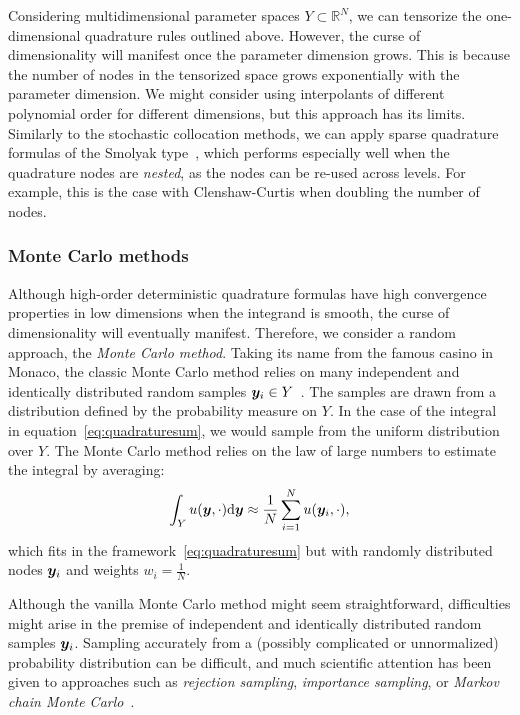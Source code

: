 Considering multidimensional parameter spaces $Y\subset \mathbb{R}^N$, we can tensorize the one-dimensional quadrature rules outlined above.
However, the curse of dimensionality will manifest once the parameter dimension grows.
This is because the number of nodes in the tensorized space grows exponentially with the parameter dimension.
We might consider using interpolants of different polynomial order for different dimensions, but this approach has its limits.
Similarly to the stochastic collocation methods, we can apply sparse quadrature formulas of the Smolyak type~\cite{bungartz2004}, which performs especially well when the quadrature nodes are \emph{nested}, as the nodes can be re-used across levels.
For example, this is the case with Clenshaw-Curtis when doubling the number of nodes.

\subsubsection{Monte Carlo methods}
Although high-order deterministic quadrature formulas have high convergence properties in low dimensions when the integrand is smooth, the curse of dimensionality will eventually manifest.
Therefore, we consider a random approach, the \emph{Monte Carlo method}.
Taking its name from the famous casino in Monaco, the classic Monte Carlo method relies on many independent and identically distributed random samples ${\bm{y}_i}\in Y$~\cite{teckentrup2013}.
The samples are drawn from a distribution defined by the probability measure on $Y$.
In the case of the integral in equation~\eqref{eq:quadraturesum}, we would sample from the uniform distribution over $Y$.
The Monte Carlo method relies on the law of large numbers to estimate the integral by averaging:
\begin{equation*}
    \int_Y u({\bm{y}},\cdot) \mathrm{d}{\bm{y}} \approx \frac{1}{N} \sum_{i=1}^N u({\bm{y}}_i,\cdot),
\end{equation*}
which fits in the framework~\eqref{eq:quadraturesum} but with randomly distributed nodes ${\bm{y}_i}$ and weights $w_i=\frac{1}{N}$.

Although the vanilla Monte Carlo method might seem straightforward, difficulties might arise in the premise of independent and identically distributed random samples ${\bm{y}_i}$.
Sampling accurately from a (possibly complicated or unnormalized) probability distribution can be difficult, and much scientific attention has been given to approaches such as \emph{rejection sampling}, \emph{importance sampling}, or \emph{Markov chain Monte Carlo}~\cite{barbu2020}.

